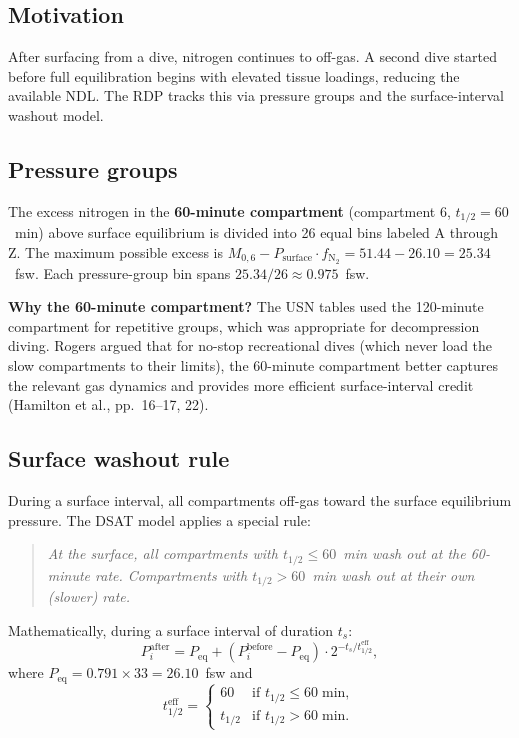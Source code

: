 \documentclass[11pt,letterpaper]{article}
\begin{document}
\subsection{Motivation}

After surfacing from a dive, nitrogen continues to off-gas.  A second dive
started before full equilibration begins with elevated tissue loadings,
reducing the available NDL.  The RDP tracks this via pressure groups and
the surface-interval washout model.

\subsection{Pressure groups}

The excess nitrogen in the \textbf{60-minute compartment} (compartment 6,
$t_{1/2} = 60$~min) above surface equilibrium is divided into 26 equal
bins labeled A through Z.  The maximum possible excess is
$M_{0,6} - P_{\text{surface}} \cdot f_{\mathrm{N}_2} = 51.44 - 26.10 = 25.34$~fsw.
Each pressure-group bin spans $25.34/26 \approx 0.975$~fsw.

\textbf{Why the 60-minute compartment?}
The USN tables used the 120-minute compartment for repetitive groups, which
was appropriate for decompression diving.  Rogers argued that for no-stop
recreational dives (which never load the slow compartments to their limits),
the 60-minute compartment better captures the relevant gas dynamics and
provides more efficient surface-interval credit (Hamilton et al., pp.~16--17, 22).

\subsection{Surface washout rule}

During a surface interval, all compartments off-gas toward the surface
equilibrium pressure.  The DSAT model applies a special rule:

\begin{quote}
\emph{At the surface, all compartments with $t_{1/2} \le 60$~min wash out
at the 60-minute rate.  Compartments with $t_{1/2} > 60$~min wash out at
their own (slower) rate.}
\end{quote}

Mathematically, during a surface interval of duration $t_s$:
\begin{equation}
  P_i^{\text{after}} = P_{\text{eq}} + (P_i^{\text{before}} - P_{\text{eq}})
    \cdot 2^{-t_s / t_{1/2}^{\text{eff}}},
  \label{eq:washout}
\end{equation}
where $P_{\text{eq}} = 0.791 \times 33 = 26.10$~fsw and
\[
  t_{1/2}^{\text{eff}} =
  \begin{cases}
    60 & \text{if } t_{1/2} \le 60\;\text{min}, \\
    t_{1/2} & \text{if } t_{1/2} > 60\;\text{min}.
  \end{cases}
\]
\end{document}
